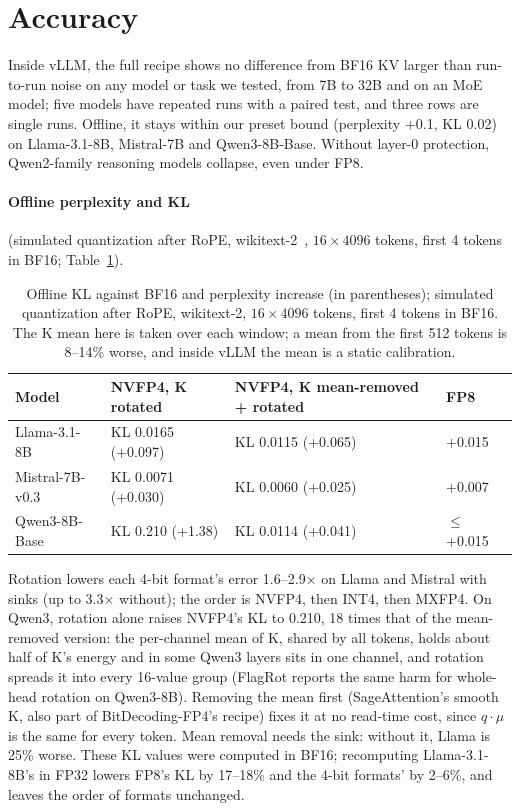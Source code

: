 \documentclass[11pt]{article}
\begin{document}


\section{Accuracy}
\label{sec:accuracy}

Inside vLLM, the full recipe shows no difference from BF16 KV larger than run-to-run noise on any model or task we tested, from 7B to 32B and on an MoE model; five models have repeated runs with a paired test, and three rows are single runs. Offline, it stays within our preset bound (perplexity +0.1, KL 0.02) on Llama-3.1-8B, Mistral-7B and Qwen3-8B-Base. Without layer-0 protection, Qwen2-family reasoning models collapse, even under FP8.




\paragraph{Offline perplexity and KL} (simulated quantization after RoPE, wikitext-2~\cite{merity2016pointer}, $16 \times 4096$ tokens, first 4 tokens in BF16; Table~\ref{tab:offline}).

\begin{table}[tbp]
\centering
\caption{Offline KL against BF16 and perplexity increase (in parentheses); simulated quantization after RoPE, wikitext-2, $16 \times 4096$ tokens, first 4 tokens in BF16. The K mean here is taken over each window; a mean from the first 512 tokens is 8--14\% worse, and inside vLLM the mean is a static calibration.}
\label{tab:offline}
\begin{tabular}{@{}llll@{}}
\toprule
Model & NVFP4, K rotated & NVFP4, K mean-removed + rotated & FP8 \\
\midrule
Llama-3.1-8B & KL 0.0165 (+0.097) & KL 0.0115 (+0.065) & +0.015 \\
Mistral-7B-v0.3 & KL 0.0071 (+0.030) & KL 0.0060 (+0.025) & +0.007 \\
Qwen3-8B-Base & KL 0.210 (+1.38) & KL 0.0114 (+0.041) & $\leq$ +0.015 \\
\bottomrule
\end{tabular}
\end{table}

Rotation lowers each 4-bit format's error 1.6--2.9$\times$ on Llama and Mistral with sinks (up to 3.3$\times$ without); the order is NVFP4, then INT4, then MXFP4. On Qwen3, rotation alone raises NVFP4's KL to 0.210, 18 times that of the mean-removed version: the per-channel mean of K, shared by all tokens, holds about half of K's energy and in some Qwen3 layers sits in one channel, and rotation spreads it into every 16-value group (FlagRot reports the same harm for whole-head rotation on Qwen3-8B). Removing the mean first (SageAttention's smooth K, also part of BitDecoding-FP4's recipe) fixes it at no read-time cost, since $q \cdot \mu$ is the same for every token. Mean removal needs the sink: without it, Llama is 25\% worse. These KL values were computed in BF16; recomputing Llama-3.1-8B's in FP32 lowers FP8's KL by 17--18\% and the 4-bit formats' by 2--6\%, and leaves the order of formats unchanged.
\end{document}
